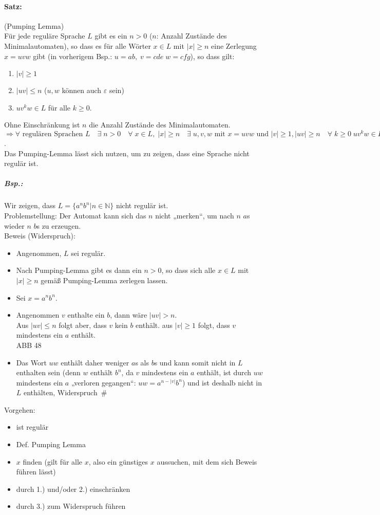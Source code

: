 \paragraph{Satz:} (Pumping Lemma)\\
Für jede reguläre Sprache $L$ gibt es ein $n>0$ ($n$: Anzahl Zustände des Minimalautomaten), so dass es für alle Wörter $x \in L$ mit $|x|\geq n$ eine Zerlegung $x=uvw$ gibt (in vorherigem Bsp.: $u=ab, \; v=cde \; w =cfg$), so dass gilt:
\begin{enumerate}
\item $|v| \geq 1$
\item $|uv|\leq n$ \quad ($u, w$ können auch $\varepsilon$ sein)
\item $uv^kw \in L$ für alle $k\geq 0$.
\end{enumerate}
Ohne Einschränkung ist $n$ die Anzahl Zustände des Minimalautomaten.\\
$\Rightarrow \forall \text{ regulären Sprachen }L\quad \exists \;n>0 \quad\forall \; x \in L, \; |x| \geq n \quad \exists \;u,v,w \text{ mit }x=uvw \text{ und }|v| \geq 1,|uv|\geq n \quad \forall \; k\geq 0 \; uv^kw\in L$.\\
Das Pumping-Lemma lässt sich nutzen, um zu zeigen, dass eine Sprache nicht regulär ist.
\subparagraph{Bsp.:} Wir zeigen, dass $L=\{a^nb^n|n\in \mathbb{N}\}$ nicht regulär ist.\\
Problemstellung: Der Automat kann sich das $n$ nicht „merken“, um nach $n$ $a$s wieder $n$ $b$s zu erzeugen. \\
Beweis (Widerspruch):
\begin{itemize}
\item Angenommen, $L$ sei regulär.
\item Nach Pumping-Lemma gibt es dann ein $n>0$, so dass sich alle $x\in L$ mit $|x|\geq n$ gemäß Pumping-Lemma zerlegen lassen.
\item Sei $x=a^nb^n$. 
\item Angenommen $v$ enthalte ein $b$, dann wäre $|uv| > n$. \\
Aus $|uv|\leq n$ folgt aber, dass $v$ kein $b$ enthält. aus $|v|\geq 1$ folgt, dass $v$ mindestens ein $a$ enthält.\\
ABB 48
\item Das Wort $uw$ enthält daher weniger $a$s als $b$s und kann somit nicht in $L$ enthalten sein (denn $w$ enthält $b^n$, da $v$ mindestens ein $a$ enthält, ist durch $uw$ mindestens ein $a$ „verloren gegangen“: $uw=a^{n-|v|}b^n$) und ist deshalb nicht in $L$ enthälten, Widerspruch\,\lightning \; \#
\end{itemize}
Vorgehen:
\begin{itemize}
\item ist regulär
\item Def. Pumping Lemma
\item $x$ finden (gilt für alle $x$, also ein günstiges $x$ aussuchen, mit dem sich Beweis führen lässt)
\item durch 1.) und/oder 2.) einschränken
\item durch 3.) zum Widerspruch führen
\end{itemize}

